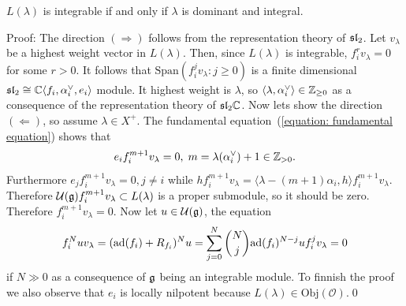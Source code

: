 \begin{itemize}
    \begin{dang}
        \begin{lemma}
            $L(\lambda)$ is integrable if and only if $\lambda$ is dominant and integral.
        \end{lemma}
    \end{dang}
    Proof: The direction $(\Rightarrow)$ follows from the representation theory of $\mathfrak{sl}_2$. Let $v_\lambda$ be a 
    highest weight vector in $L(\lambda)$. Then, since $L(\lambda)$ is integrable, $f_i^rv_\lambda=0$ for some $r>0$. It follows that 
    $\text{Span}(f_i^jv_\lambda:j\geq0)$ is a finite dimensional $\mathfrak{sl}_2\cong\mathbb{C}\langle f_i,\alpha^{\vee}_i,e_i\rangle$ module.
    It highest weight is $\lambda$, so $\langle\lambda,\alpha^{\vee}_i\rangle\in\mathbb{Z}_{\geq0}$ as a consequence of the representation theory 
    of $\mathfrak{sl}_2\mathbb{C}$. Now lets show the direction $(\Leftarrow)$, so assume $\lambda\in X^+$. The fundamental equation~(\ref{equation: fundamental equation})
    shows that 
    \begin{equation}
        e_if_i^{m+1}v_\lambda = 0,\; m = \lambda(\alpha^{\vee}_i) + 1\in\mathbb{Z}_{>0}.
    \end{equation} 
    Furthermore $e_jf_i^{m+1}v_\lambda=0,j\neq i$ while 
    $hf_i^{m+1}v_\lambda = \langle \lambda - (m+1)\alpha_i,h\rangle f_i^{m+1}v_\lambda$. Therefore 
    $\mathcal{U}(\mathfrak{g})f_i^{m+1}v_\lambda \subset L(\lambda)$ is a proper submodule, so it should be zero. Therefore 
    $f_i^{m+1}v_\lambda = 0$. Now let $u\in\mathcal{U}(\mathfrak{g})$, the equation
    \begin{equation}
        f_i^Nuv_\lambda = (\text{ad}(f_i)+R_{f_i})^Nu= \sum_{j=0}^N\binom{N}{j}\text{ad}(f_i)^{N-j}uf_i^jv_\lambda = 0  
    \end{equation}
    if $N\gg0$ as a consequence of $\mathfrak{g}$ being an integrable module. To finnish the proof we also observe that 
    $e_i$ is locally nilpotent because $L(\lambda)\in\text{Obj}(\mathcal{O})$.\qed  


\end{itemize}
